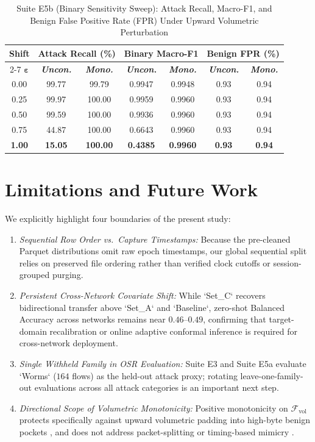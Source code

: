 ﻿\documentclass[conference]{IEEEtran}
\begin{document}
\begin{table}[t]
\caption{Suite E5b (Binary Sensitivity Sweep): Attack Recall, Macro-F1, and Benign False Positive Rate (FPR) Under Upward Volumetric Perturbation}
\begin{center}
\begin{tabular}{|c|c|c|c|c|c|c|}
\hline
\textbf{Shift} & \multicolumn{2}{|c|}{\textbf{Attack Recall (\%)}} & \multicolumn{2}{|c|}{\textbf{Binary Macro-F1}} & \multicolumn{2}{|c|}{\textbf{Benign FPR (\%)}} \\
\cline{2-7}
$\boldsymbol{\varepsilon}$ & \textbf{\textit{Uncon.}} & \textbf{\textit{Mono.}} & \textbf{\textit{Uncon.}} & \textbf{\textit{Mono.}} & \textbf{\textit{Uncon.}} & \textbf{\textit{Mono.}} \\
\hline
0.00 & 99.77 & 99.79 & 0.9947 & 0.9948 & 0.93 & 0.94 \\
0.25 & 99.97 & 100.00 & 0.9959 & 0.9960 & 0.93 & 0.94 \\
0.50 & 99.59 & 100.00 & 0.9936 & 0.9960 & 0.93 & 0.94 \\
0.75 & 44.87 & 100.00 & 0.6643 & 0.9960 & 0.93 & 0.94 \\
\textbf{1.00} & \textbf{15.05} & \textbf{100.00} & \textbf{0.4385} & \textbf{0.9960} & \textbf{0.93} & \textbf{0.94} \\
\hline
\end{tabular}
\label{tab:e5_evasion}
\end{center}
\end{table}

\section{Limitations and Future Work}
We explicitly highlight four boundaries of the present study:
\begin{enumerate}
    \item \textit{Sequential Row Order vs.\ Capture Timestamps:} Because the pre-cleaned Parquet distributions omit raw epoch timestamps, our global sequential split relies on preserved file ordering rather than verified clock cutoffs or session-grouped purging.
    \item \textit{Persistent Cross-Network Covariate Shift:} While `Set_C` recovers bidirectional transfer above `Set_A` and `Baseline`, zero-shot Balanced Accuracy across networks remains near $0.46$--$0.49$, confirming that target-domain recalibration or online adaptive conformal inference \cite{b19,b20} is required for cross-network deployment.
    \item \textit{Single Withheld Family in OSR Evaluation:} Suite E3 and Suite E5a evaluate `Worms` ($164$ flows) as the held-out attack proxy; rotating leave-one-family-out evaluations across all attack categories is an important next step.
    \item \textit{Directional Scope of Volumetric Monotonicity:} Positive monotonicity on $\mathcal{F}_{\text{vol}}$ protects specifically against upward volumetric padding into high-byte benign pockets \cite{b15}, and does not address packet-splitting or timing-based mimicry \cite{b21}.
\end{enumerate}
\end{document}
